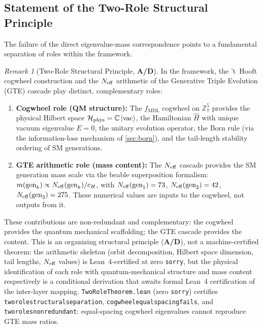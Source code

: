 \documentclass[11pt]{article}
\theoremstyle{remark}
\newtheorem{remark}[theorem]{Remark}
\newcommand{\GTE}{\text{GTE}}
\newcommand{\MDL}{\text{MDL}}
\newcommand{\lean}[1]{%
  \penalty-100
  \begingroup\def\_{\textunderscore\allowbreak}\texttt{#1}\endgroup}
\newcommand{\CatAD}{\textbf{A/D}}
\newcommand{\ket}[1]{|{#1}\rangle}
\newcommand{\Hil}{\mathcal{H}}
\newcommand{\Ham}{\hat{H}}
\newcommand{\Neff}{N_{\rm eff}}
\begin{document}
\subsection{Statement of the Two-Role Structural Principle}
\label{ssec:two_role}

The failure of the direct eigenvalue-mass correspondence points to a
fundamental separation of roles within the \GTE{} framework.

\begin{remark}[Two-Role Structural Principle, \CatAD{}]
\label{rem:two_role}
In the \GTE{} framework, the 't~Hooft cogwheel construction and the
$\Neff$ arithmetic of the Generative Triple Evolution (GTE) cascade play
distinct, complementary roles:
\begin{enumerate}[leftmargin=2em]
\item \textbf{Cogwheel role (QM structure):} The $f_{\MDL}$ cogwheel
  on $\mathbb{Z}_7^5$ provides the physical Hilbert space
  $\Hil_{\rm phys} = \mathbb{C}\,\ket{\text{vac}}$, the Hamiltonian
  $\Ham$ with unique vacuum eigenvalue $E=0$, the unitary evolution
  operator, the Born rule (via the information-loss mechanism of
  \cref{sec:born}), and the tail-length stability ordering of SM
  generations.
\item \textbf{GTE arithmetic role (mass content):} The $\Neff$ cascade
  provides the SM generation mass scale via the beable superposition
  formalism: $m(\text{gen}_k) \propto \Neff(\text{gen}_k)/c_H$, with
  $\Neff(\text{gen}_1) = 73$, $\Neff(\text{gen}_2) = 42$,
  $\Neff(\text{gen}_3) = 275$.
  These numerical values are inputs to the cogwheel, not outputs from it.
\end{enumerate}
These contributions are non-redundant and complementary: the
cogwheel provides the quantum mechanical scaffolding; the GTE cascade
provides the content.
This is an organizing structural principle (\CatAD{}), not a
machine-certified theorem: the arithmetic skeleton (orbit decomposition,
Hilbert space dimension, tail lengths, $\Neff$ values) is Lean~4-certified
at zero \texttt{sorry}, but the physical identification of each role with
quantum-mechanical structure and mass content respectively is a conditional
derivation that awaits formal Lean~4 certification of the inter-layer
mapping.
\lean{TwoRoleTheorem.lean} (zero \texttt{sorry}) certifies
\lean{two\_role\_structural\_separation},
\lean{cogwheel\_equal\_spacing\_fails}, and
\lean{two\_roles\_non\_redundant}: equal-spacing cogwheel eigenvalues cannot
reproduce GTE mass ratios.
\end{remark}
\end{document}
